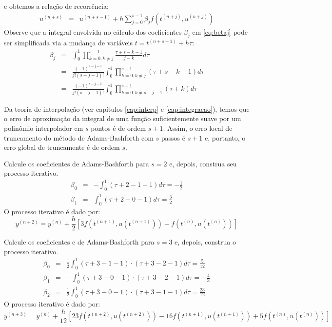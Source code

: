 e obtemos a relação de recorrência:
\begin{eqnarray}\label{eq:mpm2}
  u^{(n+s)}  &=& u^{(n+s-1)}  + h\sum_{j=0}^{s-1}\beta_j f(t^{(n+j)},u^{(n+j)})
\end{eqnarray}
Observe que a integral envolvida no cálculo dos coeficientes $\beta_j$ em \eqref{eq:betaj} pode ser simplificada via a mudança de variáveis $t=t^{(n+s-1)}+h\tau$:
\begin{eqnarray}\label{eq:betaj_s}
\beta_j&=& \int_{0}^{1} \prod_{k=0,k\neq j}^{s-1} \frac{\tau+s-k-1}{j-k}d\tau\\
&=& \frac{(-1)^{s-j-1}}{j!(s-j-1)!}\int_{0}^{1} \prod_{k=0,k\neq j}^{s-1}(\tau+s-k-1)d\tau\\
&=& \frac{(-1)^{s-j-1}}{j!(s-j-1)!}\int_{0}^{1} \prod_{k=0,k\neq s-j-1}^{s-1}(\tau+k)d\tau
\end{eqnarray}


\begin{obs} Da teoria de interpolação (ver capítulos \ref{cap:interp} e \ref{cap:integracao}), temos que o erro de aproximação da integral de uma função suficientemente suave por um polinômio interpolador em $s$ pontos é de ordem $s+1$. Assim, o erro local de truncamento do método de Adams-Bashforth com $s$ passos é $s+1$ e, portanto, o erro global de truncamente é de ordem $s$.
\end{obs}


\begin{ex} Calcule os coeficientes de Adams-Bashforth para $s=2$ e, depois, construa seu processo iterativo.
 \begin{eqnarray}
  \beta_0&=&-\int_0^1 (\tau+2-1-1)d\tau=-\frac{1}{2}\\
  \beta_1&=&\int_0^1 (\tau+2-0-1)d\tau=\frac{3}{2}
 \end{eqnarray}
 O processo iterativo é dado por:
 \begin{equation}
  y^{(n+2)}=y^{(n)}+\frac{h}{2}\left[3f\left(t^{(n+1)},u(t^{(n+1)})\right)-f\left(t^{(n)},u(t^{(n)})\right)\right]
 \end{equation}
\end{ex}


\begin{ex} Calcule os coeficientes e de Adams-Bashforth para $s=3$ e, depois, construa o processo iterativo.
 \begin{eqnarray}
  \beta_0&=&\frac{1}{2}\int_0^1 {(\tau+3-1-1)}\cdot {(\tau+3-2-1)} d\tau=\frac{5}{12}\\
  \beta_1&=&-\int_0^1 {(\tau+3-0-1)}\cdot {(\tau+3-2-1)} d\tau=-\frac{4}{3}\\
  \beta_2&=&\frac{1}{2}\int_0^1 {(\tau+3-0-1)}\cdot {(\tau+3-1-1)} d\tau=\frac{23}{12}
 \end{eqnarray}
 O processo iterativo é dado por:
 \begin{equation}
  y^{(n+3)}=y^{(n)}+\frac{h}{12}\left[23f\left(t^{(n+2)},u(t^{(n+2)})\right)-16f\left(t^{(n+1)},u(t^{(n+1)})\right)+5f\left(t^{(n)},u(t^{(n)})\right)\right]
 \end{equation}
\end{ex}

